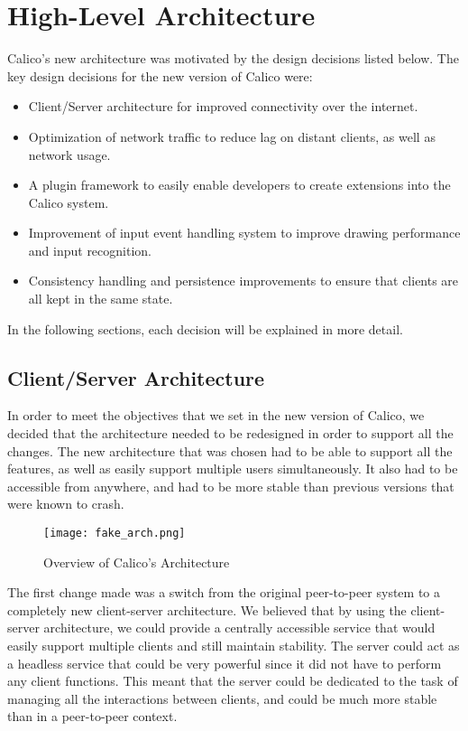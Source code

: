 \chapter{High-Level Architecture}

Calico's new architecture was motivated by the design decisions listed below. The key design decisions for the new version of Calico were:

\begin{itemize}\itemsep1pt
  \item Client/Server architecture for improved connectivity over the internet.
  \item Optimization of network traffic to reduce lag on distant clients, as well as network usage.
  \item A plugin framework to easily enable developers to create extensions into the Calico system.
  \item Improvement of input event handling system to improve drawing performance and input recognition.
  \item Consistency handling and persistence improvements to ensure that clients are all kept in the same state.
\end{itemize}

In the following sections, each decision will be explained in more detail.



\section{Client/Server Architecture}
In order to meet the objectives that we set in the new version of Calico, we decided that the architecture needed to be redesigned in order to support all the changes. The new architecture that was chosen had to be able to support all the features, as well as easily support multiple users simultaneously. It also had to be accessible from anywhere, and had to be more stable than previous versions that were known to crash.

\begin{figure}[h]
\centering
\texttt{[image: fake\_arch.png]}
\caption{Overview of Calico's Architecture}
\label{fig:calico_arch}
\end{figure}

The first change made was a switch from the original peer-to-peer system to a completely new client-server architecture. We believed that by using the client-server architecture, we could provide a centrally accessible service that would easily support multiple clients and still maintain stability. The server could act as a headless service that could be very powerful since it did not have to perform any client functions. This meant that the server could be dedicated to the task of managing all the interactions between clients, and could be much more stable than in a peer-to-peer context.

